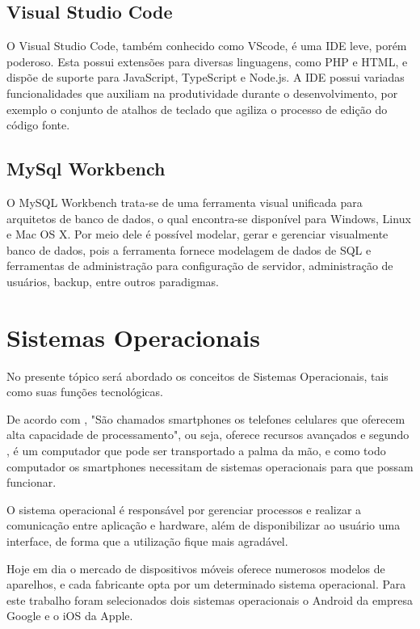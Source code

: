 \subsection{Visual Studio Code}

O Visual Studio Code, também conhecido como VScode, é uma IDE leve, porém poderoso. Esta possui extensões para diversas linguagens, como PHP e HTML, e dispõe de suporte para JavaScript, TypeScript e Node.js. A IDE possui variadas funcionalidades que auxiliam na produtividade durante o desenvolvimento, por exemplo o conjunto de atalhos de teclado que agiliza o processo de edição do código fonte.\cite{vscode}

\subsection{MySql Workbench}

O MySQL Workbench trata-se de uma ferramenta visual unificada para arquitetos de banco de dados, o qual encontra-se disponível para Windows, Linux e Mac OS X. Por meio dele é possível modelar, gerar e gerenciar visualmente banco de dados, pois a ferramenta fornece modelagem de dados de SQL e ferramentas de administração para configuração de servidor, administração de usuários, backup, entre outros paradigmas.


\section{Sistemas Operacionais}

No presente tópico será abordado os conceitos de Sistemas Operacionais, tais como suas funções tecnológicas.

De acordo com , "São chamados smartphones os telefones celulares que oferecem alta capacidade de processamento", ou seja, oferece recursos avançados e segundo , é um computador que pode ser transportado a palma da mão, e como todo computador os smartphones necessitam de sistemas operacionais para que possam funcionar.

O sistema operacional é responsável por gerenciar processos e realizar a comunicação entre aplicação e hardware, além de disponibilizar ao usuário uma interface, de forma que a utilização fique mais agradável. \cite {velloso2014informatica}

Hoje em dia o mercado de dispositivos móveis oferece numerosos modelos de aparelhos, e cada fabricante opta por um determinado sistema operacional. Para este trabalho foram selecionados dois sistemas operacionais o Android da empresa Google e o iOS da Apple. 

